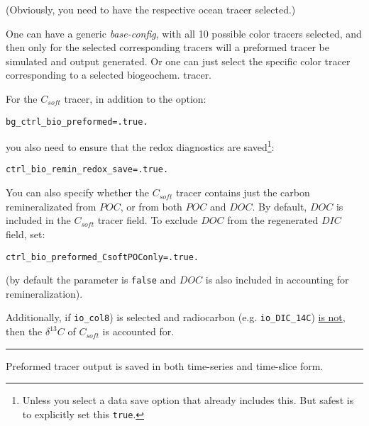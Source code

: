 \noindent (Obviously, you need to have the respective ocean tracer selected.)

One can have a generic \textit{base-config}, with all 10 possible color tracers selected, and then only for the selected corresponding tracers will a preformed tracer be simulated and output generated. Or one can just select the specific color tracer corresponding to a selected biogeochem. tracer.

\noindent For the \(C_{soft}\) tracer, in addition to the option:
\vspace{-1mm}\small\begin{verbatim}
bg_ctrl_bio_preformed=.true.
\end{verbatim}\normalsize\vspace{-1mm}
you also need to ensure that the redox diagnostics are saved\footnote{Unless you select a data save option that already includes this. But safest is to explicitly set this \texttt{true}.}:
\vspace{-1mm}\small\begin{verbatim}
ctrl_bio_remin_redox_save=.true.
\end{verbatim}\normalsize\vspace{-1mm}

You can also specify whether the \(C_{soft}\) tracer contains just the carbon remineralizated from \(POC\), or from both \(POC\) and \(DOC\). By default,  \(DOC\) is included in the \(C_{soft}\) tracer field. To exclude \(DOC\) from the regenerated \(DIC\) field, set:
\vspace{-1mm}\small\begin{verbatim}
ctrl_bio_preformed_CsoftPOConly=.true.
\end{verbatim}\normalsize\vspace{-1mm}
(by default the parameter is \texttt{false} and \(DOC\) is also included in accounting for remineralization).

Additionally, if \texttt{io\_col8}) is selected and radiocarbon (e.g. \texttt{io\_DIC\_14C}) \uline{is not}, then the \(\delta^{13}C\) of \(C_{soft}\) is accounted for.

\vspace{1mm}
\noindent\rule{4cm}{0.5pt}
\vspace{2mm}

\noindent Preformed tracer output is saved in both time-series and time-slice form.

